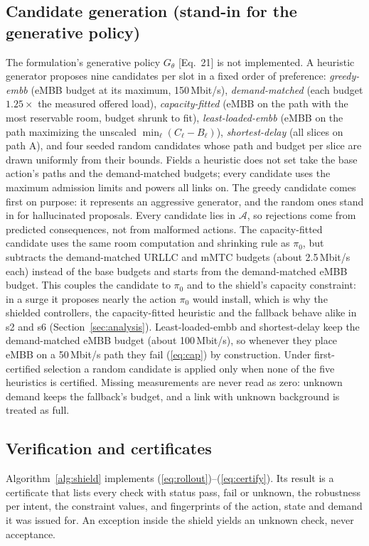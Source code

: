 \documentclass[conference]{IEEEtran}
\newcommand{\Acal}{\mathcal{A}}
\begin{document}
\subsection{Candidate generation (stand-in for the generative policy)}
The formulation's generative policy $G_\theta$ [Eq.~21] is not implemented. A
heuristic generator proposes nine candidates per slot in a fixed order of
preference: \emph{greedy-embb} (eMBB budget at its maximum, 150\,Mbit/s),
\emph{demand-matched} (each budget $1.25\times$ the measured offered load),
\emph{capacity-fitted} (eMBB on the path with the most reservable room, budget
shrunk to fit), \emph{least-loaded-embb} (eMBB on the path maximizing the unscaled
$\min_{\ell}(C_\ell - B_\ell)$), \emph{shortest-delay} (all slices on path A), and
four seeded random candidates whose path and budget per slice are drawn uniformly
from their bounds. Fields a heuristic does not set take the base action's paths and
the demand-matched budgets; every candidate uses the maximum admission limits and
powers all links on. The greedy
candidate comes first on purpose: it represents an aggressive generator, and the
random ones stand in for hallucinated proposals. Every candidate lies in $\Acal$, so
rejections come from predicted consequences, not from malformed actions. The
capacity-fitted candidate uses the same room computation and shrinking rule as
$\pi_0$, but subtracts the demand-matched URLLC and mMTC budgets (about 2.5\,Mbit/s each)
instead of the base budgets and starts from the demand-matched eMBB budget. This
couples the candidate to $\pi_0$ and to the shield's capacity constraint: in a surge
it proposes nearly the action $\pi_0$ would install, which is why the shielded
controllers, the capacity-fitted heuristic and the fallback behave alike in s2 and s6
(Section~\ref{sec:analysis}). Least-loaded-embb and shortest-delay keep the
demand-matched eMBB budget (about 100\,Mbit/s), so whenever they place eMBB on a
50\,Mbit/s path they fail (\ref{eq:cap}) by construction. Under first-certified
selection a random candidate is applied only when none of the five heuristics is
certified. Missing
measurements are never read as zero: unknown demand keeps the fallback's budget, and a
link with unknown background is treated as full.

\subsection{Verification and certificates}
Algorithm~\ref{alg:shield} implements (\ref{eq:rollout})--(\ref{eq:certify}). Its
result is a certificate that lists every check with status pass, fail or unknown,
the robustness per intent, the constraint values, and fingerprints of the action,
state and demand it was issued for. An exception inside the shield yields an
unknown check, never acceptance.
\end{document}
